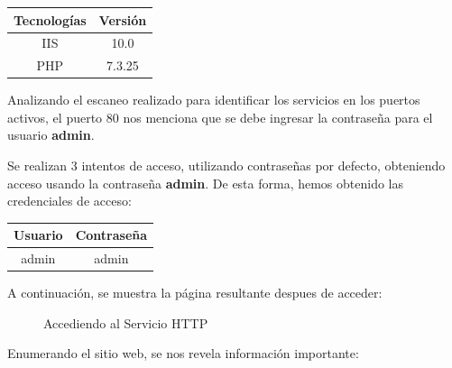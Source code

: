 \documentclass[a4paper]{article} %
\begin{document}
        \vspace{0.4cm}
        \centering
        \begin{tabular}{ c | c}
                \textbf{Tecnologías} & \textbf{Versión} \\
                \hline
		IIS & 10.0 \\
                PHP & 7.3.25
        \end{tabular}

        \vspace{0.4cm}

        \justifying

	Analizando el escaneo realizado para identificar los servicios en los puertos activos, el puerto 80 nos menciona que se debe ingresar la contraseña para el usuario \textbf{admin}.

	Se realizan 3 intentos de acceso, utilizando contraseñas por defecto, obteniendo acceso usando la contraseña \textbf{admin}. De esta forma, hemos obtenido las credenciales de acceso:

	\vspace{0.4cm}
        \centering
        \begin{tabular}{ c | c}
                \textbf{Usuario} & \textbf{Contraseña} \\
                \hline
                admin & admin \\
        \end{tabular}
        
	\clearpage

	\vspace{0.4cm}

	\justifying
	A continuación, se muestra la página resultante despues de acceder:

	\begin{figure}[h]
                \centering
                \setlength{\fboxrule}{0.8pt}
                \caption{Accediendo al Servicio HTTP}
        \end{figure}

        \vspace{0.3cm}

	Enumerando el sitio web, se nos revela información importante:
\end{document}
